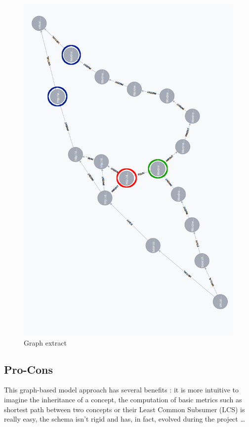 \begin{figure}[h]
\begin{center}
\includegraphics[scale=0.55]{./Primitives/graphExtract.png}
\end{center}
\caption{Graph extract}
\label{fig:graph}
\end{figure}

\subsection{Pro-Cons} %
\label{sub:pro_cons}
This graph-based model approach has several benefits : it is more intuitive to imagine the inheritance of a concept, the computation of basic metrics such as shortest path between two concepts or their Least Common Subsumer (LCS) is really easy, the schema isn't rigid and has, in fact, evolved during the project \dots\\

